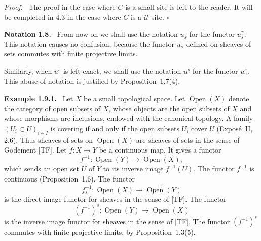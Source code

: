 \documentclass[11pt]{article}
\newcommand{\U}{\mathcal{U}}
\newcommand{\Ouv}{\operatorname{Open}}
\newcommand{\qedtext}{\hfill\(\square\)}
\newenvironment{remarktext}[1]{\par\medskip\noindent\textbf{#1.}\ }{\par\medskip}
\newenvironment{prooftext}{\par\noindent\emph{Proof.}\ }{\par\medskip}
\begin{document}
\begin{prooftext}
The proof in the case where \(C\) is a small site is left to the reader. It will be completed in 4.3 in the case where \(C\) is a \(\U\)-site. \qedtext
\end{prooftext}

\begin{remarktext}{Notation 1.8}
From now on we shall use the notation \(u_s\) for the functor \(u_s^{\gamma}\). This notation causes no confusion, because the functor \(u_s\) defined on sheaves of sets commutes with finite projective limits.
\end{remarktext}

Similarly, when \(u^s\) is left exact, we shall use the notation \(u^s\) for the functor \(u^s_{\gamma}\). This abuse of notation is justified by Proposition~1.7(4).

\begin{remarktext}{Example 1.9.1}
Let \(X\) be a small topological space. Let \(\Ouv(X)\) denote the category of open subsets of \(X\), whose objects are the open subsets of \(X\) and whose morphisms are inclusions, endowed with the canonical topology. A family \((U_i\subset U)_{i\in I}\) is covering if and only if the open subsets \(U_i\) cover \(U\) (Expos\'e~II, 2.6). Thus sheaves of sets on \(\Ouv(X)\) are sheaves of sets in the sense of Godement [TF]. Let \(f:X\to Y\) be a continuous map. It gives a functor
\[
f^{-1}:\Ouv(Y)\to\Ouv(X),
\]
which sends an open set \(U\) of \(Y\) to its inverse image \(f^{-1}(U)\). The functor \(f^{-1}\) is continuous (Proposition~1.6). The functor
\[
f^{-1}_s:\widetilde{\Ouv(X)}\to\widetilde{\Ouv(Y)}
\]
is the direct image functor for sheaves in the sense of [TF]. The functor
\[
(f^{-1})^s:\widetilde{\Ouv(Y)}\to\widetilde{\Ouv(X)}
\]
is the inverse image functor for sheaves in the sense of [TF]. The functor \((f^{-1})^s\) commutes with finite projective limits, by Proposition~1.3(5).
\end{remarktext}
\end{document}
